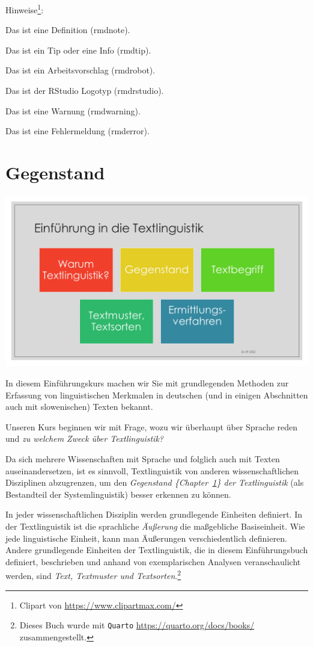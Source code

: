 \documentclass[
  letterpaper,
]{scrbook}
\begin{document}
Hinweise\footnote{Clipart von \url{https://www.clipartmax.com/}}:

Das ist eine Definition (rmdnote).

Das ist ein Tip oder eine Info (rmdtip).

Das ist ein Arbeitsvorschlag (rmdrobot).

Das ist der RStudio Logotyp (rmdrstudio).

Das ist eine Warnung (rmdwarning).

Das ist eine Fehlermeldung (rmderror).

\hypertarget{sec-gegenstand}{%
\chapter{Gegenstand}\label{sec-gegenstand}}

\includegraphics[width=1\textwidth,height=\textheight]{./pictures/Diapozitiv5.PNG}

In diesem Einführungskurs machen wir Sie mit grundlegenden Methoden zur
Erfassung von linguistischen Merkmalen in deutschen (und in einigen
Abschnitten auch mit slowenischen) Texten bekannt.

Unseren Kurs beginnen wir mit Frage, wozu wir überhaupt über Sprache
reden und \emph{zu welchem Zweck über Textlinguistik?}

Da sich mehrere Wissenschaften mit Sprache und folglich auch mit Texten
auseinandersetzen, ist es sinnvoll, Textlinguistik von anderen
wissenschaftlichen Disziplinen abzugrenzen, um den \emph{Gegenstand
\{Chapter~\ref{sec-gegenstand}\} der Textlinguistik} (als Bestandteil
der Systemlinguistik) besser erkennen zu können.

In jeder wissenschaftlichen Disziplin werden grundlegende Einheiten
definiert. In der Textlinguistik ist die sprachliche \emph{Äußerung} die
maßgebliche Basiseinheit. Wie jede linguistische Einheit, kann man
Äußerungen verschiedentlich definieren. Andere grundlegende Einheiten
der Textlinguistik, die in diesem Einführungsbuch definiert, beschrieben
und anhand von exemplarischen Analysen veranschaulicht werden, sind
\emph{Text, Textmuster und Textsorten}.\footnote{Dieses Buch wurde mit
  \texttt{Quarto} \url{https://quarto.org/docs/books/} zusammengestellt.}
\end{document}
